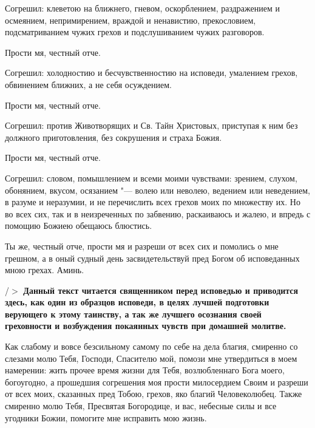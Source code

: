 Согрешил: клеветою на ближнего, гневом, оскорблением, раздражением и осмеянием, непримирением, враждой и ненавистию, прекословием, подсматриванием чужих грехов и подслушиванием чужих разговоров. 



Прости мя, честный отче. 



Согрешил: холодностию и бесчувственностию на исповеди, умалением грехов, обвинением ближних, а не себя осуждением. 



Прости мя, честный отче. 



Согрешил: против Животворящих и Св. Тайн Христовых, приступая к ним без должного приготовления, без сокрушения и страха Божия. 



Прости мя, честный отче. 



Согрешил: словом, помышлением и всеми моими чувствами: зрением, слухом, обонянием, вкусом, осязанием "--- волею или неволею, ведением или неведением, в разуме и неразумии, и не перечислить всех грехов моих по множеству их. Но во всех сих, так и в неизреченных по забвению, раскаиваюсь и жалею, и впредь с помощию Божиею обещаюсь блюстись. 



Ты же, честный отче, прости мя и разреши от всех сих и помолись о мне грешном, а в оный судный день засвидетельствуй пред Богом об исповеданных мною грехах. Аминь. 

/$>$\bfseries *\normalfont{} Данный текст читается священником перед исповедью и приводится здесь, как один из образцов исповеди, в целях лучшей подготовки верующего к этому таинству, а так же лучшего осознания своей греховности и возбуждения покаянных чувств при домашней молитве. 

 

 

 

 



\bigskip\bigskip\mychapterending

 


Как слабому и вовсе безсильному самому по себе на дела благия, смиренно со слезами молю Тебя, Господи, Спасителю мой, помози мне утвердиться в моем намерении: жить прочее время жизни для Тебя, возлюбленнаго Бога моего, богоугодно, а прошедшия согрешения моя прости милосердием Своим и разреши от всех моих, сказанных пред Тобою, грехов, яко благий Человеколюбец. Также смиренно молю Тебя, Пресвятая Богородице, и вас, небесные силы и все угодники Божии, помогите мне исправить мою жизнь.\itshape  

